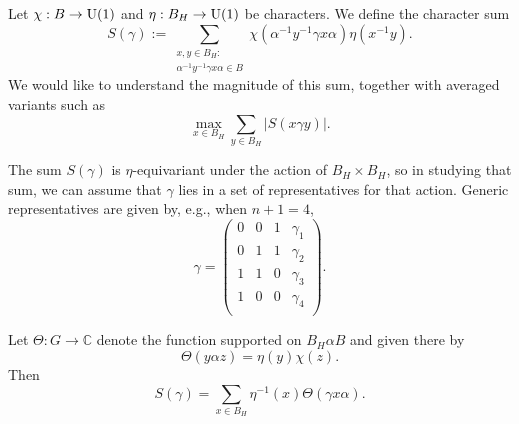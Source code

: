 \documentclass[reqno]{amsart} 
\begin{document}
Let $\chi : B \rightarrow \operatorname{U}(1)$ and $\eta : B_H \rightarrow \operatorname{U}(1)$ be characters.  We define the character sum
\begin{equation*}
  S(\gamma) := \sum_{
    \substack{
      x,y \in B_H : 
      \\
       \alpha^{-1} y^{-1} \gamma x \alpha  \in B
    }
  }
  \chi (\alpha^{-1} y^{-1} \gamma x \alpha ) \eta (x^{-1} y).
\end{equation*}
We would like to understand the magnitude of this sum, together with averaged variants such as
\begin{equation*}
\max_{x \in B_H} \sum_{y \in B_H} \lvert S(x \gamma y) \rvert.
\end{equation*}
\begin{remark}
  The sum $S(\gamma)$ is $\eta$-equivariant under the action of $B_H \times B_H$, so in studying that sum, we can assume that $\gamma$ lies in a set of representatives for that action.  Generic representatives are given by, e.g., when $n+1=4$,
  \begin{equation}\label{eq:cj59nab7hw}
    \gamma = \begin{pmatrix}
               0 & 0 & 1 & \gamma_1  \\
               0 & 1 & 1 & \gamma_2  \\
               1 & 1 & 0 &  \gamma_3  \\
               1 & 0 & 0 & \gamma_4 \\
             \end{pmatrix}.
  \end{equation}
\end{remark}
Let $\Theta : G \rightarrow \mathbb{C}$ denote the function supported on $B_H \alpha B$ and given there by
\begin{equation*}
  \Theta(y \alpha z) = \eta(y) \chi(z).
\end{equation*}
Then
\begin{equation*}
  S (\gamma) = \sum_{x \in B_H}
  \eta^{-1}(x)
  \Theta (\gamma x \alpha).
\end{equation*}
\end{document}
